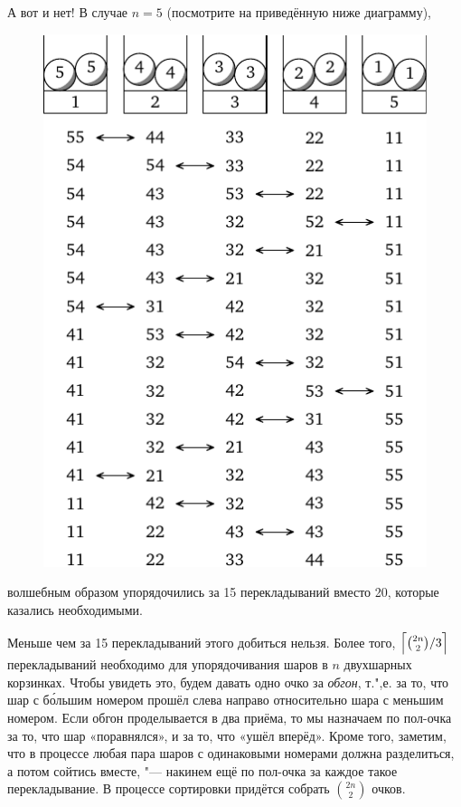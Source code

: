 \documentclass[twoside]{book}
\begin{document}
А вот и нет!
В случае $n = 5$ (посмотрите на приведённую ниже диаграмму),
\begin{figure}[!ht]
\centering
\includegraphics{mp/wink-280}
\end{figure}
волшебным образом упорядочились за 15 перекладываний вместо 20, которые казались необходимыми.

Меньше чем за 15 перекладываний этого добиться нельзя.
Более того, $\Bigl\lceil\binom{2n}{2}/3\Bigr\rceil$ перекладываний необходимо для упорядочивания шаров в $n$ двухшарных корзинках.
Чтобы увидеть это, будем давать одно очко за \emph{обгон}, т.",е. за то, что шар с б\'{о}льшим номером прошёл слева направо относительно шара с меньшим номером.
Если обгон проделывается в два приёма, то мы назначаем по пол-очка за то, что шар «поравнялся», и за то, что «ушёл вперёд».
Кроме того, заметим, что в процессе любая пара шаров с одинаковыми номерами должна разделиться, а потом сойтись вместе, "--- накинем ещё по пол-очка за каждое такое перекладывание. 
В процессе сортировки придётся собрать $\binom{2n}2$ очков.
\end{document}
